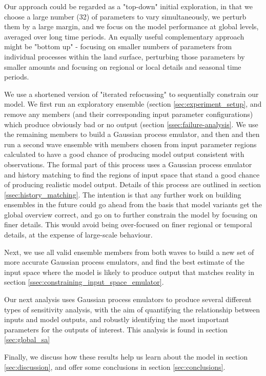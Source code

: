 \documentclass[gmd, manuscript]{copernicus}
\begin{document}
Our approach could be regarded as a "top-down" initial exploration, in that we choose a large number (32) of parameters to vary simultaneously, we perturb them by a large margin, and we focus on the model performance at global levels, averaged over long time periods. An equally useful complementary approach might be "bottom up" - focusing on smaller numbers of parameters from individual processes within the land surface, perturbing those parameters by smaller amounts and focusing on regional or local details and seasonal time periods. 

We use a shortened version of "iterated refocussing" to sequentially constrain our model.  We first run an exploratory ensemble (section \ref{sec:experiment_setup}, and remove any members (and their corresponding input parameter configurations) which produce obviously bad or no output (section \ref{ssec:failure-analysis}. We use the remaining members to build a Gaussian process emulator, and then and then run a second wave ensemble with members chosen from input parameter regions calculated to have a good chance of producing model output consistent with observations. The formal part of this process uses a Gaussian process emulator and history matching to find the regions of input space that stand a good chance of producing realistic model output. Details of this process are outlined in section \ref{ssec:history_matching}. The intention is that any further work on building ensembles in the future could go ahead from the basis that model variants get the global overview correct, and go on to further constrain the model by focusing on finer details. This would avoid being over-focused on finer regional or temporal details, at the expense of large-scale behaviour.

Next, we use all valid ensemble members from both waves to build a new set of more accurate Gaussian process emulators, and find the best estimate of the input space where the model is likely to produce output that matches reality in section \ref{ssec:constraining_input_space_emulator}.

Our next analysis uses Gaussian process emulators to produce several different types of sensitivity analysis, with the aim of quantifying the relationship between inputs and model outputs, and robustly identifying the most important parameters for the outputs of interest. This analysis is found in section \ref{sec:global_sa}

Finally, we discuss how these results help us learn about the model in section \ref{sec:discussion}, and offer some conclusions in section \ref{sec:conclusions}.
\end{document}
